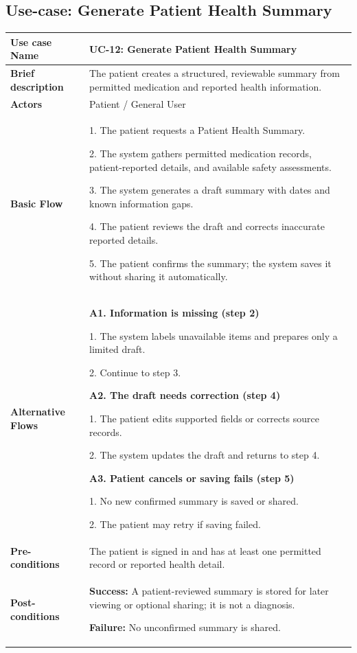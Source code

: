 \subsection{Use-case: Generate Patient Health Summary}
\label{uc:uc-12}
\begin{longtable}{|p{}|p{}|}
\hline
\textbf{Use case Name} & UC-12: Generate Patient Health Summary \\ \hline
\textbf{Brief description} & The patient creates a structured, reviewable summary from permitted medication and reported health information. \\ \hline
\textbf{Actors} & Patient / General User \\ \hline
\textbf{Basic Flow} &
1. The patient requests a Patient Health Summary.\par
2. The system gathers permitted medication records, patient-reported details, and available safety assessments.\par
3. The system generates a draft summary with dates and known information gaps.\par
4. The patient reviews the draft and corrects inaccurate reported details.\par
5. The patient confirms the summary; the system saves it without sharing it automatically.
\\ \hline
\textbf{Alternative Flows} &
\textbf{A1. Information is missing (step 2)}\par
1. The system labels unavailable items and prepares only a limited draft.\par
2. Continue to step 3.
\par\smallskip
\textbf{A2. The draft needs correction (step 4)}\par
1. The patient edits supported fields or corrects source records.\par
2. The system updates the draft and returns to step 4.
\par\smallskip
\textbf{A3. Patient cancels or saving fails (step 5)}\par
1. No new confirmed summary is saved or shared.\par
2. The patient may retry if saving failed.
\\ \hline
\textbf{Pre-conditions} & The patient is signed in and has at least one permitted record or reported health detail. \\ \hline
\textbf{Post-conditions} & \textbf{Success:} A patient-reviewed summary is stored for later viewing or optional sharing; it is not a diagnosis.\par
\textbf{Failure:} No unconfirmed summary is shared. \\ \hline
\end{longtable}

